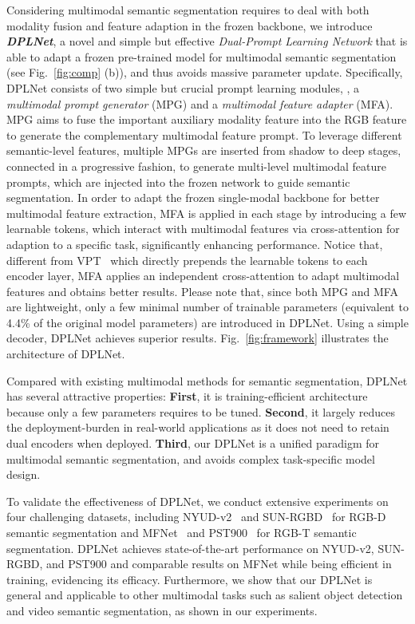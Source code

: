 \documentclass[10pt,twocolumn,letterpaper]{article}
\begin{document}
Considering multimodal semantic segmentation requires to deal with both modality fusion and feature adaption in the frozen backbone, we introduce \emph{\textbf{DPLNet}}, a novel and simple but effective \emph{Dual-Prompt Learning Network} that is able to adapt a frozen pre-trained model for multimodal semantic segmentation (see Fig.~\ref{fig:comp} (b)), and thus avoids massive parameter update. Specifically, DPLNet consists of two simple but crucial prompt learning modules, \ie, a \emph{multimodal prompt generator} (MPG) and a \emph{multimodal feature adapter} (MFA). MPG aims to fuse the important auxiliary modality feature into the RGB feature to generate the complementary multimodal feature prompt. To leverage different semantic-level features, multiple MPGs are inserted from shadow to deep stages, connected in a progressive fashion, to generate multi-level multimodal feature prompts, which are injected into the frozen network to guide semantic segmentation. In order to adapt the frozen single-modal backbone for better multimodal feature extraction, MFA is applied in each stage by introducing a few learnable tokens, which interact with multimodal features via cross-attention for adaption to a specific task, significantly enhancing performance. Notice that, different from VPT~\cite{VPT} which directly prepends the learnable tokens to each encoder layer, MFA applies an independent cross-attention to adapt multimodal features and obtains better results. Please note that, since both MPG and MFA are lightweight, only a few minimal number of trainable parameters (equivalent to 4.4\% of the original model parameters) are introduced in DPLNet. Using a simple decoder, DPLNet achieves superior results. Fig.~\ref{fig:framework} illustrates the architecture of DPLNet.

Compared with existing multimodal methods for semantic segmentation, DPLNet has several attractive properties: \textbf{First}, it is training-efficient architecture because only a few parameters requires to be tuned. \textbf{Second}, it largely reduces the deployment-burden in real-world applications as it does not need to retain dual encoders when deployed. \textbf{Third}, our DPLNet is a unified paradigm for multimodal semantic segmentation, and avoids complex task-specific model design.

To validate the effectiveness of DPLNet, we conduct extensive experiments on four challenging datasets, including NYUD-v2~\cite{nyuv2} and SUN-RGBD~\cite{sunrgbd} for RGB-D semantic segmentation and MFNet~\cite{mfnet} and PST900~\cite{pst900} for RGB-T semantic segmentation. DPLNet achieves state-of-the-art performance on NYUD-v2, SUN-RGBD, and PST900 and comparable results on MFNet while being efficient in training, evidencing its efficacy. Furthermore, we show that our DPLNet is general and applicable to other multimodal tasks such as salient object detection and video semantic segmentation, as shown in our experiments.
\end{document}
